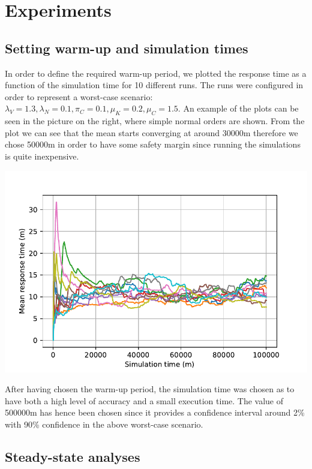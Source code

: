 \section{Experiments}

\subsection{Setting warm-up and simulation times}

\begin{minipage}{.6\textwidth}
  In order to define the required warm-up period, we plotted the response time as a function of the simulation time for 10 different runs. The runs were configured in order to represent a worst-case scenario: $\lambda_V=1.3, \lambda_N=0.1,\pi_C=0.1,\mu_K=0.2,\mu_C=1.5$. An example of the plots can be seen in the picture on the right, where simple normal orders are shown. From the plot we can see that the mean starts converging at around 30000m therefore we chose 50000m in order to have some safety margin since running the simulations is quite inexpensive.
\end{minipage}
\begin{minipage}{.4\textwidth}
  \centering
  \includegraphics[width=\textwidth]{figs/warmup_definition.pdf}
  \label{fig:warmup}
\end{minipage}

After having chosen the warm-up period, the simulation time was chosen as to have both a high level of accuracy and a small execution time. The value of 500000m has hence been chosen since it provides a confidence interval around 2\% with 90\% confidence in the above worst-case scenario.

\subsection{Steady-state analyses}

